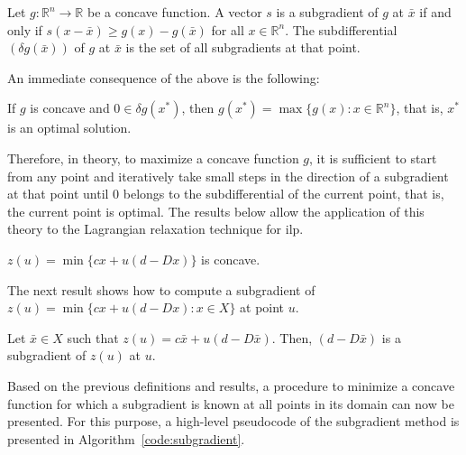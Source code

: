 \begin{definition}\label{definition:subgradient}
	Let $g : \mathbb{R}^n \rightarrow \mathbb{R}$ be a concave function. A vector $s$ is a subgradient of $g$ at $\bar{x}$ if and only if $s(x - \bar{x}) \geq g(x) - g(\bar{x})$ for all $x \in \mathbb{R}^n$. The subdifferential $(\delta g(\bar{x}))$ of $g$ at $\bar{x}$ is the set of all subgradients at that point.
\end{definition}

An immediate consequence of the above is the following:

\begin{proposition}\label{proposition:optimal}
	If $g$ is concave and $0 \in \delta g(x^*)$, then $g(x^*) = \max\{g(x) : x \in \mathbb{R}^n\}$, that is, $x^*$ is an optimal solution.
\end{proposition}

Therefore, in theory, to maximize a concave function $g$, it is sufficient to
start from any point and iteratively take small steps in the direction of a
subgradient at that point until $0$ belongs to the subdifferential of the
current point, that is, the current point is optimal. The results below allow
the application of this theory to the Lagrangian relaxation technique for \gls{ilp}.

\begin{proposition} \label{proposition-zu-convex}
	$z(u) = \min \{cx + u (d - Dx)\}$ is concave.
\end{proposition}

The next result shows how to compute a subgradient of $z(u) = \min \{cx + u (d -
	Dx) : x \in X\}$ at point $u$.

\begin{proposition}
	Let $\bar{x} \in X$ such that $z(u) = c \bar{x} + u(d - D\bar{x})$. Then, $(d - D\bar{x})$ is a subgradient of $z(u)$ at $u$.
\end{proposition}

Based on the previous definitions and results, a procedure to minimize a
concave function for which a subgradient is known at all points in its domain
can now be presented. For this purpose, a high-level pseudocode of the
subgradient method is presented in Algorithm~\ref{code:subgradient}.

